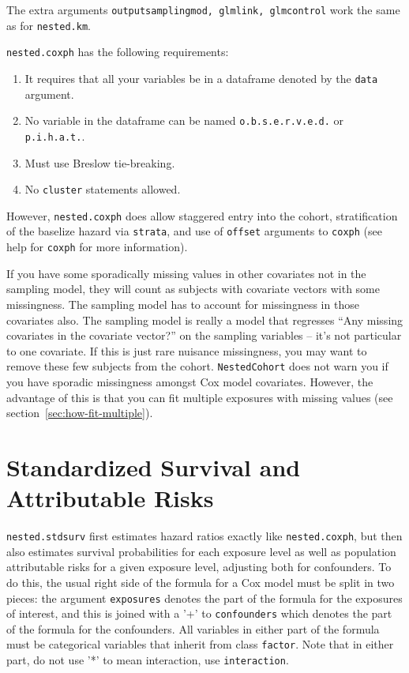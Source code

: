 \documentclass[10pt]{article}
\begin{document}
The extra arguments \texttt{outputsamplingmod, glmlink, glmcontrol} work the same as for
\texttt{nested.km}.

\texttt{nested.coxph} has the following requirements:
\begin{enumerate}
\item It requires that all your variables be in a dataframe denoted by the \texttt{data}
argument.
\item No variable in the dataframe can be named \texttt{o.b.s.e.r.v.e.d.} or
\texttt{p.i.h.a.t.}.
\item Must use Breslow tie-breaking.
\item No \texttt{cluster} statements allowed.
\end{enumerate}

However, \texttt{nested.coxph} does allow staggered entry into the cohort, stratification
of the baselize hazard via \texttt{strata}, and use of \texttt{offset} arguments to
\texttt{coxph} (see help for \texttt{coxph} for more information).

If you have some sporadically missing values in other covariates not in the sampling
model, they will count as subjects with covariate vectors with some missingness.  The
sampling model has to account for missingness in those covariates also.  The sampling
model is really a model that regresses ``Any missing covariates in the covariate vector?''
on the sampling variables -- it's not particular to one covariate.  If this is just rare
nuisance missingness, you may want to remove these few subjects from the cohort.
\texttt{NestedCohort} does not warn you if you have sporadic missingness amongst Cox model
covariates.  However, the advantage of this is that you can fit multiple exposures with
missing values (see section~\ref{sec:how-fit-multiple}).



\section{Standardized Survival and Attributable Risks}
\label{sec:stand-surv-attr}

\texttt{nested.stdsurv} first estimates hazard ratios exactly like
\texttt{nested.coxph}, but then also estimates survival probabilities for each exposure
level as well as population attributable risks for a given exposure level, adjusting both
for confounders.  To do this, the usual right side of the formula for a Cox model must be
split in two pieces: the argument \texttt{exposures} denotes the part of the formula for
the exposures of interest, and this is joined with a '+' to \texttt{confounders} which
denotes the part of the formula for the confounders.  All variables in either part of the
formula must be categorical variables that inherit from class \texttt{factor}.  Note that
in either part, do not use '*' to mean interaction, use \texttt{interaction}.
\end{document}
